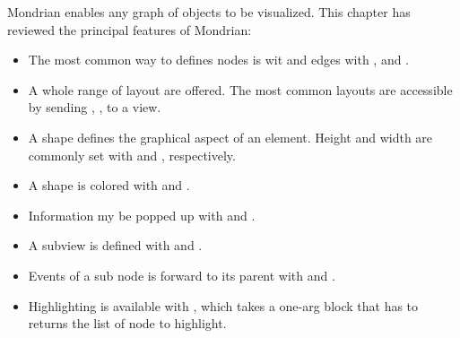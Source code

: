 \documentclass[a4paper,10pt,twoside]{book}
\begin{document}
Mondrian enables any graph of objects to be visualized. This chapter has reviewed the principal features of Mondrian:
\begin{itemize}
\item The most common way to defines nodes is wit  and edges with ,  and .
\item A whole range of layout are offered. The most common layouts are accessible by sending , ,  to a view.
\item A shape defines the graphical aspect of an element. Height and width are commonly set with  and , respectively. 
\item A shape is colored with  and .
\item Information my be popped up with  and .
\item A subview is defined with  and .
\item Events of a sub node is forward to its parent with  and .
\item Highlighting is available with , which takes a one-arg block that has to returns the list of node to highlight.
\end{itemize}

%
%


\ifx\wholebook\relax\else
   
   
\end{document}
